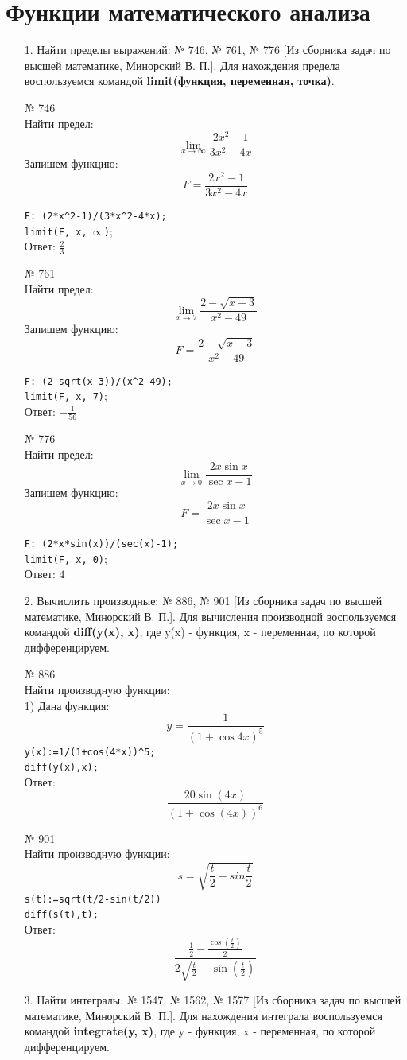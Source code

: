 \documentclass[article, bachelor, och, pract]{SCWorks}
\begin{document}
\section{Функции математического анализа}
\begin{itemize}
\item[1.] Найти пределы выражений: № 746, № 761, № 776 [Из сборника задач по высшей математике, Минорский В. П.]. Для нахождения предела воспользуемся командой \textbf{limit(функция, переменная, точка)}.

№ 746\\
Найти предел:
$$\lim_{x \to \infty}\frac{2x^2-1}{3x^2-4x}$$
Запишем функцию:
$$F=\frac{2x^2-1}{3x^2-4x}$$

\texttt{F: (2*x\^{}2-1)/(3*x\^{}2-4*x);}\\
\texttt{limit(F, x, $\infty$)}; \\ 
Ответ: $\frac{2}{3}$

№ 761\\
Найти предел:
$$\lim_{x \to 7}\frac{2-\sqrt{x-3}}{x^2-49}$$
Запишем функцию:
$$F=\frac{2-\sqrt{x-3}}{x^2-49}$$

\texttt{F: (2-sqrt(x-3))/(x\^{}2-49);}\\
\texttt{limit(F, x, 7)}; \\ 
Ответ: $-\frac{1}{56}$

№ 776\\
Найти предел:
$$\lim_{x \to 0}\frac{2x\sin{x}}{\sec{x}-1}$$
Запишем функцию:
$$F=\frac{2x\sin{x}}{\sec{x}-1}$$

\texttt{F: (2*x*sin(x))/(sec(x)-1);}\\
\texttt{limit(F, x, 0)}; \\ 
Ответ: $4$

\item[2.] Вычислить производные: № 886, № 901 [Из сборника задач по высшей математике, Минорский В. П.]. Для вычисления производной воспользуемся командой \textbf{diff(y(x), x)}, где y(x) - функция, x - переменная, по которой дифференцируем.

№ 886\\
Найти производную функции:\\
1) Дана функция: $$ y = \frac{1}{(1+\cos{4x})^5} $$
\texttt{y(x):=1/(1+cos(4*x))\^{}5;}\\
\texttt{diff(y(x),x);}\\
Ответ: \[\frac{20\sin{(4x)}}{{{\left( 1+\cos{(4x)}\right) }^{6}}}\]


№ 901\\
Найти производную функции:\\
$$ s = \sqrt{\frac{t}{2} - sin{\frac{t}{2}}} $$
\texttt{s(t):=sqrt(t/2-sin(t/2))}\\
\texttt{diff(s(t),t);}\\
Ответ:
\[\frac{\frac{1}{2}-\frac{\cos{\left( \frac{t}{2}\right) }}{2}}{2\sqrt{\frac{t}{2}-\sin{\left( \frac{t}{2}\right) }}}\]
\item[3.] Найти интегралы: № 1547, № 1562, № 1577 [Из сборника задач по высшей математике, Минорский В. П.]. Для нахождения интеграла воспользуемся командой \textbf{integrate(y, x)}, где y - функция, x - переменная, по которой дифференцируем.


\end{itemize}
\end{document}
